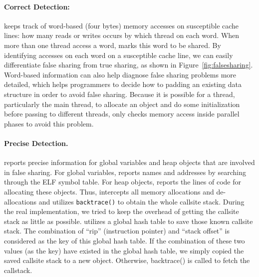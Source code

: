 \paragraph{Correct Detection:} \Cheetah{} keeps track of word-based (four bytes) memory accesses on susceptible cache lines: how many reads or writes occurs by which thread on each word. When more than one thread access a word, \Cheetah{} marks this word to be shared. By identifying accesses on each word on a susceptible cache line, we can easily differentiate false sharing from true sharing, as shown in Figure~\ref{fig:falsesharing}. Word-based information can also help diagnose false sharing problems more detailed, which helps programmers to decide how to padding an existing data structure in order to avoid false sharing.  Because it is possible for a thread, particularly the main thread, to allocate an object and do some initialization before passing to different threads,  \cheetah{} only checks memory access inside parallel phases to avoid this problem.

\paragraph{Precise Detection.} \Cheetah{} reports precise information for global variables and heap objects that are involved in false sharing. For global variables, \Cheetah{} reports names and addresses by searching through the ELF symbol table. For heap objects, \Cheetah{} reports the lines of code for allocating these objects.  
Thus, \Cheetah{} intercepts all memory allocations and de-allocations and utilizes \texttt{backtrace()} to obtain the whole callsite stack. During the real implementation, we tried to keep the overhead of getting the callsite stack as little as possible. \cheetah{} utilizes a global hash table to save those known callsite stack. The combination of ``rip'' (instruction pointer) and ``stack offset'' is considered as the key of this global hash table. If the combination of these two values (as the key) have existed in the global hash table, we simply copied the saved callsite stack to a new object. Otherwise, backtrace() is called to fetch the callstack.  






 